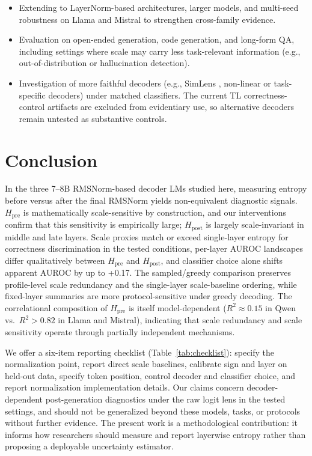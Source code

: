 \documentclass{ieeeaccess}
\newcommand{\Hpre}{H_{\text{pre}}}
\newcommand{\Hpost}{H_{\text{post}}}
\begin{document}
\begin{itemize}
\item Extending to LayerNorm-based architectures, larger models, and multi-seed robustness on Llama and Mistral to strengthen cross-family evidence.
\item Evaluation on open-ended generation, code generation, and long-form QA, including settings where scale may carry less task-relevant information (e.g., out-of-distribution or hallucination detection).
\item Investigation of more faithful decoders (e.g., SimLens \cite{ma2025simlens}, non-linear or task-specific decoders) under matched classifiers. The current TL correctness-control artifacts are excluded from evidentiary use, so alternative decoders remain untested as substantive controls.
\end{itemize}


\section{Conclusion}
\label{sec:conclusion}

In the three 7--8B RMSNorm-based decoder LMs studied here, measuring entropy before versus after the final RMSNorm yields non-equivalent diagnostic signals. $\Hpre$ is mathematically scale-sensitive by construction, and our interventions confirm that this sensitivity is empirically large; $\Hpost$ is largely scale-invariant in middle and late layers. Scale proxies match or exceed single-layer entropy for correctness discrimination in the tested conditions, per-layer AUROC landscapes differ qualitatively between $\Hpre$ and $\Hpost$, and classifier choice alone shifts apparent AUROC by up to +0.17. The sampled/greedy comparison preserves profile-level scale redundancy and the single-layer scale-baseline ordering, while fixed-layer summaries are more protocol-sensitive under greedy decoding. The correlational composition of $\Hpre$ is itself model-dependent ($R^2 \approx 0.15$ in Qwen vs.\ $R^2 > 0.82$ in Llama and Mistral), indicating that scale redundancy and scale sensitivity operate through partially independent mechanisms.

We offer a six-item reporting checklist (Table~\ref{tab:checklist}): specify the normalization point, report direct scale baselines, calibrate sign and layer on held-out data, specify token position, control decoder and classifier choice, and report normalization implementation details. Our claims concern decoder-dependent post-generation diagnostics under the raw logit lens in the tested settings, and should not be generalized beyond these models, tasks, or protocols without further evidence. The present work is a methodological contribution: it informs how researchers should measure and report layerwise entropy rather than proposing a deployable uncertainty estimator.
\end{document}
